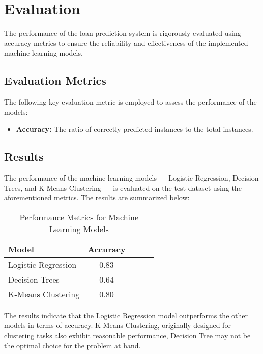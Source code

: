 \documentclass[10pt]{article}
\begin{document}
\section*{Evaluation}

The performance of the loan prediction system is rigorously evaluated using accuracy metrics to ensure the reliability and effectiveness of the implemented machine learning models.

\subsection*{Evaluation Metrics}

The following key evaluation metric is employed to assess the performance of the models:

\begin{itemize}
    \item \textbf{Accuracy:} The ratio of correctly predicted instances to the total instances.
\end{itemize}

\subsection*{Results}

The performance of the machine learning models — Logistic Regression, Decision Trees, and K-Means Clustering — is evaluated on the test dataset using the aforementioned metrics. The results are summarized below:

\begin{table}[h]
    \centering
    \begin{tabular}{|l|c|c|c|c|}
        \hline
        \textbf{Model} & \textbf{Accuracy}\\
        \hline
        Logistic Regression & 0.83 \\
        Decision Trees & 0.64 \\
        K-Means Clustering & 0.80 \\
        \hline
    \end{tabular}
    \caption{Performance Metrics for Machine Learning Models}
    \label{tab:performance}
\end{table}

The results indicate that the Logistic Regression model outperforms the other models in terms of accuracy.  K-Means Clustering, originally designed for clustering tasks also exhibit reasonable performance, Decision Tree may not be the optimal choice for the problem at hand.
\end{document}
